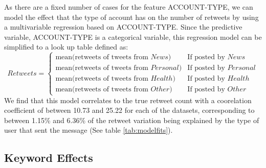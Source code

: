 As there are a fixed number of cases for the feature ACCOUNT-TYPE, we can model the effect that the type of account has on the number of retweets by using a multivariable regression based on ACCOUNT-TYPE. Since the predictive variable, ACCOUNT-TYPE is a categorical variable, this regression model can be simplified to a look up table defined as:
\begin{equation}
Retweets  =
\begin{cases}
 \text{mean(retweets of tweets from }News\text{)} & \text{If posted by }News \\
 \text{mean(retweets of tweets from }Personal\text{)} & \text{If posted by }Personal \\
 \text{mean(retweets of tweets from }Health\text{)} & \text{If posted by }Health \\
 \text{mean(retweets of tweets from }Other\text{)} & \text{If posted by }Other
\end{cases}
\end{equation}
We find that this model correlates to the true retweet count with a coorelation coefficient of between 10.73 and 25.22 for each of the datasets, corresponding to between 1.15\% and 6.36\% of the retweet variation being explained by the type of user that sent the message (See table \ref{tab:modelfits}).

\subsection{Keyword Effects}

